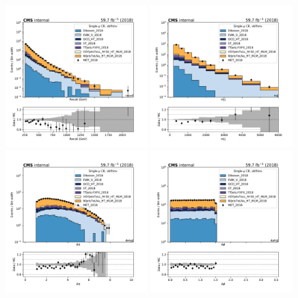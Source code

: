 \begin{figure}[htbp]
    \begin{center}
        \includegraphics[width=0.49\textwidth]{fig/datamc/cr_1m_vbf/cr_1m_vbf_recoil_losf_2018.pdf}
        \includegraphics[width=0.49\textwidth]{fig/datamc/cr_1m_vbf/cr_1m_vbf_mjj_losf_2018.pdf} \\
        \includegraphics[width=0.49\textwidth]{fig/datamc/cr_1m_vbf/cr_1m_vbf_detajj_losf_2018.pdf}
        \includegraphics[width=0.49\textwidth]{fig/datamc/cr_1m_vbf/cr_1m_vbf_dphijj_losf_2018.pdf}

\end{center}
\end{figure}
